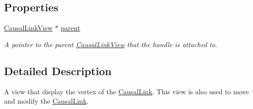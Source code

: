 \subsection*{Properties}
\begin{DoxyCompactItemize}
\item 
\hypertarget{interface_causal_link_handle_view_a5575d6f2d41b9179b560b7f3857ca1db}{\hyperlink{interface_causal_link_view}{Causal\-Link\-View} $\ast$ \hyperlink{interface_causal_link_handle_view_a5575d6f2d41b9179b560b7f3857ca1db}{parent}}\label{interface_causal_link_handle_view_a5575d6f2d41b9179b560b7f3857ca1db}

\begin{DoxyCompactList}\small\item\em A pointer to the parent \hyperlink{interface_causal_link_view}{Causal\-Link\-View} that the handle is attached to. \end{DoxyCompactList}\end{DoxyCompactItemize}


\subsection{Detailed Description}
A view that display the vertex of the \hyperlink{interface_causal_link}{Causal\-Link}. This view is also used to move and modify the \hyperlink{interface_causal_link}{Causal\-Link}. 

